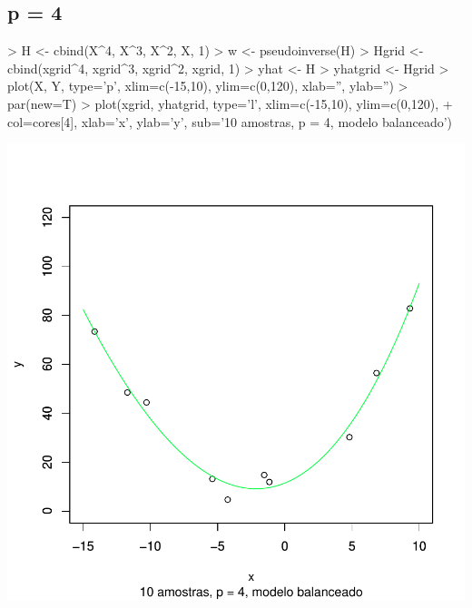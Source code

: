 \documentclass{article}
\begin{document}
\subsection{p = 4}
\begin{Schunk}
\begin{Sinput}
> H <- cbind(X^4, X^3, X^2, X, 1)
> w <- pseudoinverse(H) %
> Hgrid <- cbind(xgrid^4, xgrid^3, xgrid^2, xgrid, 1)
> yhat <- H %
> yhatgrid <- Hgrid %
> plot(X, Y, type='p', xlim=c(-15,10), ylim=c(0,120), xlab='', ylab='')
> par(new=T)
> plot(xgrid, yhatgrid, type='l', xlim=c(-15,10), ylim=c(0,120),
+      col=cores[4], xlab='x', ylab='y', sub='10 amostras, p = 4, modelo balanceado')
\end{Sinput}
\end{Schunk}
\includegraphics{aprox-005}
\end{document}
